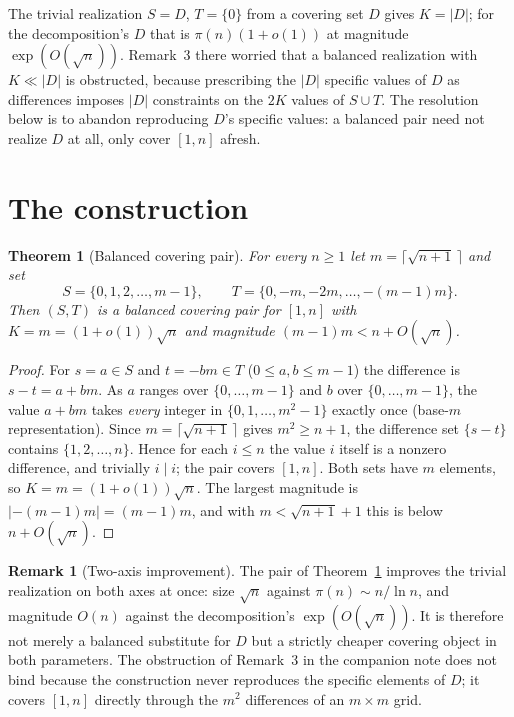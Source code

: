\documentclass[11pt]{article}
\newtheorem{theorem}{Theorem}
\theoremstyle{definition}
\newtheorem{remark}{Remark}
\newcommand{\abs}[1]{\left\lvert #1 \right\rvert}
\begin{document}
The trivial realization $S=D$, $T=\{0\}$ from a covering set $D$ gives $K=\abs D$; for the
decomposition's $D$ that is $\pi(n)(1+o(1))$ at magnitude $\exp(O(\sqrt n))$. Remark~3
there worried that a balanced realization with $K\ll\abs D$ is obstructed, because
prescribing the $\abs D$ specific values of $D$ as differences imposes $\abs D$ constraints
on the $2K$ values of $S\cup T$. The resolution below is to abandon reproducing $D$'s
specific values: a balanced pair need not realize $D$ at all, only cover $[1,n]$ afresh.

\section{The construction}

\begin{theorem}[Balanced covering pair]\label{thm:main}
For every $n\ge1$ let $m=\lceil\sqrt{n+1}\,\rceil$ and set
\[
  S=\{0,1,2,\dots,m-1\},\qquad T=\{0,-m,-2m,\dots,-(m-1)m\}.
\]
Then $(S,T)$ is a balanced covering pair for $[1,n]$ with $K=m=(1+o(1))\sqrt n$ and
magnitude $(m-1)m< n+O(\sqrt n)$.
\end{theorem}

\begin{proof}
For $s=a\in S$ and $t=-bm\in T$ ($0\le a,b\le m-1$) the difference is
$s-t=a+bm$. As $a$ ranges over $\{0,\dots,m-1\}$ and $b$ over $\{0,\dots,m-1\}$, the value
$a+bm$ takes \emph{every} integer in $\{0,1,\dots,m^2-1\}$ exactly once (base-$m$
representation). Since $m=\lceil\sqrt{n+1}\,\rceil$ gives $m^2\ge n+1$, the difference set
$\{s-t\}$ contains $\{1,2,\dots,n\}$. Hence for each $i\le n$ the value $i$ itself is a
nonzero difference, and trivially $i\mid i$; the pair covers $[1,n]$. Both sets have $m$
elements, so $K=m=(1+o(1))\sqrt n$. The largest magnitude is $\abs{-(m-1)m}=(m-1)m$, and
with $m<\sqrt{n+1}+1$ this is below $n+O(\sqrt n)$.
\end{proof}

\begin{remark}[Two-axis improvement]
The pair of Theorem~\ref{thm:main} improves the trivial realization on both axes at once:
size $\sqrt n$ against $\pi(n)\sim n/\ln n$, and magnitude $O(n)$ against the
decomposition's $\exp(O(\sqrt n))$. It is therefore not merely a balanced substitute for
$D$ but a strictly cheaper covering object in both parameters. The obstruction of Remark~3
in the companion note does not bind because the construction never reproduces the specific
elements of $D$; it covers $[1,n]$ directly through the $m^2$ differences of an
$m\times m$ grid.
\end{remark}
\end{document}
